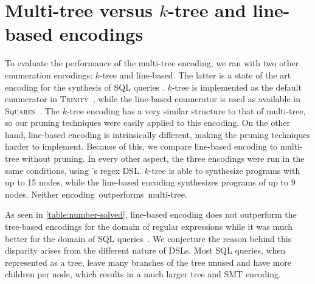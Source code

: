 \section{\texorpdfstring{Multi-tree versus \(k\)-tree and line-based encodings}{Multi-tree versus k-tree and line-based encodings}}\label{sec:multi-tree-vs-encodings}



To evaluate the performance of the multi-tree encoding, we ran \Forest{} with two other enumeration encodings: \(k\)-tree and line-based.
The latter is a state of the art encoding for the synthesis of SQL queries \cite{Orvalho19}. \(k\)-tree is implemented as the default enumerator in \textsc{Trinity}~\cite{trinity19}, while the line-based enumerator is used as available in \textsc{Squares}~\cite{squares-webpage}. The \(k\)-tree encoding has a very similar structure to that of multi-tree, so our pruning techniques were easily applied to this encoding. On the other hand, line-based encoding is intrinsically different, making the pruning techniques harder to implement. Because of this, we compare line-based encoding to multi-tree without pruning.
In every other aspect, the three encodings were run in the same conditions, using \Forest{}'s regex \ac{DSL}.
\(k\)-tree is able to synthesize programs with up to 15 nodes, while the line-based encoding synthesizes programs of up to 9 nodes. Neither encoding~outperforms~multi-tree. %

As seen in \autoref{table:number-solved}, line-based encoding does not outperform the tree-based encodings for the domain of regular expressions while it was much better for the domain of SQL queries~\cite{Orvalho19}. We conjecture the reason behind this disparity arises from the different nature of DSLs. Most SQL queries, when represented as a tree, leave many branches of the tree unused and have more children per node, which results in a much larger tree and SMT encoding.


